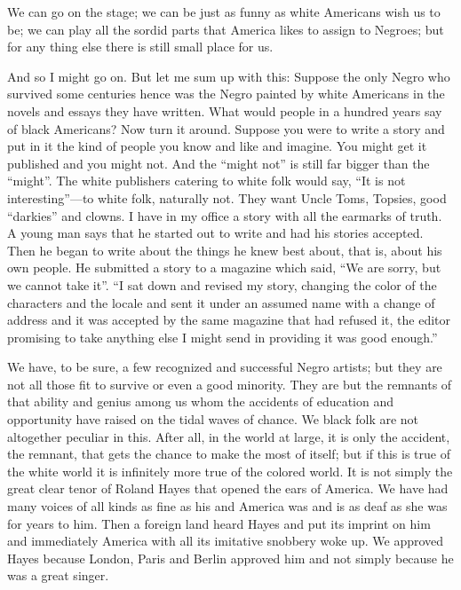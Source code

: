 \documentclass[letterpaper,10pt,english]{jupyterBook}
\begin{document}
\sphinxAtStartPar
We can go on the stage; we can be just as funny as white Americans wish us to be; we can play all the sordid parts that America likes to assign to Negroes; but for any thing else there is still small place for us.

\sphinxAtStartPar
And so I might go on. But let me sum up with this: Suppose the only Negro who survived some centuries hence was the Negro painted by white Americans in the novels and essays they have written. What would people in a hundred years say of black Americans? Now turn it around. Suppose you were to write a story and put in it the kind of people you know and like and imagine. You might get it published and you might not. And the “might not” is still far bigger than the “might”. The white publishers catering to white folk would say, “It is not interesting”—to white folk, naturally not. They want Uncle Toms, Topsies, good “darkies” and clowns. I have in my office a story with all the earmarks of truth. A young man says that he started out to write and had his stories accepted. Then he began to write about the things he knew best about, that is, about his own people. He submitted a story to a magazine which said, “We are sorry, but we cannot take it”. “I sat down and revised my story, changing the color of the characters and the locale and sent it under an assumed name with a change of address and it was accepted by the same magazine that had refused it, the editor promising to take anything else I might send in providing it was good enough.”

\sphinxAtStartPar
We have, to be sure, a few recognized and successful Negro artists; but they are not all those fit to survive or even a good minority. They are but the remnants of that ability and genius among us whom the accidents of education and opportunity have raised on the tidal waves of chance. We black folk are not altogether peculiar in this. After all, in the world at large, it is only the accident, the remnant, that gets the chance to make the most of itself; but if this is true of the white world it is infinitely more true of the colored world. It is not simply the great clear tenor of Roland Hayes that opened the ears of America. We have had many voices of all kinds as fine as his and America was and is as deaf as she was for years to him. Then a foreign land heard Hayes and put its imprint on him and immediately America with all its imitative snobbery woke up. We approved Hayes because London, Paris and Berlin approved him and not simply because he was a great singer.
\end{document}
